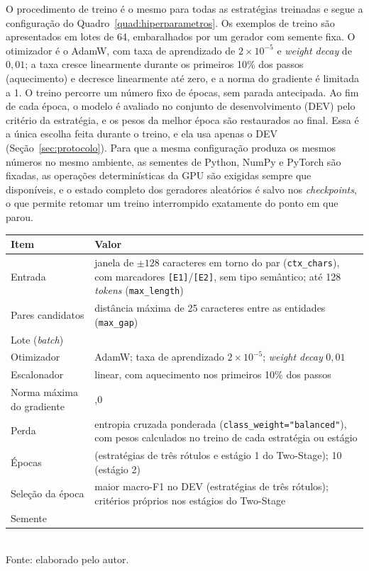 O procedimento de treino é o mesmo para todas as estratégias treinadas e segue a
configuração do Quadro~\ref{quad:hiperparametros}. Os exemplos de treino são
apresentados em lotes de 64, embaralhados por um gerador com semente fixa. O
otimizador é o AdamW, com taxa de aprendizado de $2\times10^{-5}$ e
\emph{weight decay} de $0{,}01$; a taxa cresce linearmente durante os primeiros 10\%
dos passos (aquecimento) e decresce linearmente até zero, e a norma do gradiente é
limitada a 1. O treino percorre um número fixo de épocas, sem parada
antecipada. Ao fim de cada época, o modelo é avaliado no conjunto de desenvolvimento
(DEV) pelo critério da estratégia, e os pesos da melhor época são restaurados ao
final. Essa é a única escolha feita durante o treino, e ela usa apenas o DEV
(Seção~\ref{sec:protocolo}). Para que a mesma configuração produza os mesmos números
no mesmo ambiente, as sementes de Python, NumPy e PyTorch são fixadas, as operações
determinísticas da GPU são exigidas sempre que disponíveis, e o estado completo dos
geradores aleatórios é salvo nos \emph{checkpoints}, o que permite retomar um treino
interrompido exatamente do ponto em que parou.

\begin{quadro}[htbp]
  \centering
  \caption{Hiperparâmetros e configuração do \emph{fine-tuning}, comuns às estratégias treinadas.}
  \label{quad:hiperparametros}
  \small
  \begin{tabular}{l >{\raggedright\arraybackslash}p{8.8cm}}
  \toprule
  Item & Valor \\
  \midrule
  Entrada & janela de $\pm128$ caracteres em torno do par (\texttt{ctx\_chars}), com marcadores \texttt{[E1]}/\texttt{[E2]}, sem tipo semântico; até 128 \emph{tokens} (\texttt{max\_length}) \\
  Pares candidatos & distância máxima de 25 caracteres entre as entidades (\texttt{max\_gap}) \\
  Lote (\emph{batch}) & 64 \\
  Otimizador & AdamW; taxa de aprendizado $2\times10^{-5}$; \emph{weight decay} $0{,}01$ \\
  Escalonador & linear, com aquecimento nos primeiros 10\% dos passos \\
  Norma máxima do gradiente & 1,0 \\
  Perda & entropia cruzada ponderada (\texttt{class\_weight="balanced"}), com pesos calculados no treino de cada estratégia ou estágio \\
  Épocas & 3 (estratégias de três rótulos e estágio 1 do Two-Stage); 10 (estágio 2) \\
  Seleção da época & maior macro-F1 no DEV (estratégias de três rótulos); critérios próprios nos estágios do Two-Stage \\
  Semente & 42 \\
  \bottomrule
  \end{tabular}\\[4pt]
  {\footnotesize Fonte: elaborado pelo autor.}
\end{quadro}

